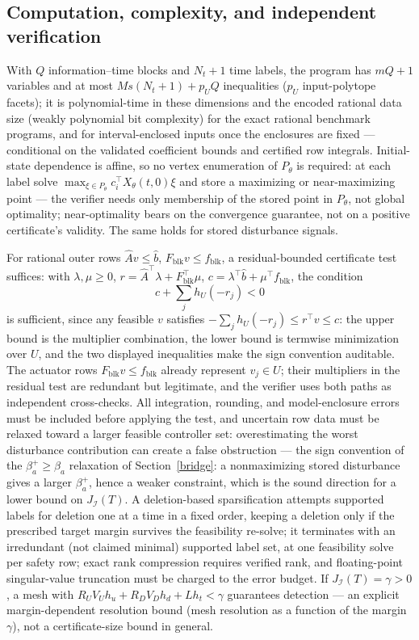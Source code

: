 \documentclass[10pt,twocolumn]{article}
\theoremstyle{plain}
\theoremstyle{definition}
\theoremstyle{remark}
\begin{document}
\subsection{Computation, complexity, and independent verification}\label{computation}

With \(Q\) information--time blocks and \(N_t + 1\) time labels, the program
has \(mQ + 1\) variables and at most \(Ms(N_t{+}1) + p_U Q\) inequalities
(\(p_U\) input-polytope facets); it is polynomial-time in these dimensions and the encoded rational data
size (weakly polynomial bit complexity) for the exact rational benchmark
programs, and for interval-enclosed inputs once the enclosures are fixed ---
conditional on the validated coefficient bounds and certified row
integrals.
Initial-state dependence is affine, so no vertex enumeration of \(P_\theta\)
is required: at each label solve
\(\max_{\xi \in P_\theta} c_i^\top X_\theta(t,0)\xi\) and store a maximizing
or near-maximizing point --- the verifier needs only membership of the stored
point in \(P_\theta\), not global optimality; near-optimality bears on the
convergence guarantee, not on a positive certificate's validity. The same
holds for stored disturbance signals.

For rational outer rows \(\widehat A v \le \widehat b\),
\(F_{\mathrm{blk}} v \le f_{\mathrm{blk}}\), a residual-bounded certificate
test suffices: with \(\lambda, \mu \ge 0\),
\(r = \widehat A^\top \lambda + F_{\mathrm{blk}}^\top \mu\),
\(c = \lambda^\top \widehat b + \mu^\top f_{\mathrm{blk}}\), the condition
\[
c + \sum_j h_U(-r_j) < 0
\tag{11}
\]
is sufficient, since any feasible \(v\) satisfies
\(-\sum_j h_U(-r_j) \le r^\top v \le c\): the upper bound is the
multiplier combination, the lower bound is termwise minimization over
\(U\), and the two displayed inequalities make the sign convention
auditable. The actuator rows \(F_{\mathrm{blk}} v \le f_{\mathrm{blk}}\)
already represent \(v_j \in U\); their multipliers in the residual test
are redundant but legitimate, and the verifier uses both paths as
independent cross-checks. All integration, rounding, and
model-enclosure errors must be included before applying the test, and
uncertain row data must be relaxed toward a larger feasible controller set:
overestimating the worst disturbance contribution can create a false
obstruction --- the sign convention of the \(\beta_a^{+} \ge \beta_a\)
relaxation of Section~\ref{bridge}: a nonmaximizing stored disturbance
gives a larger \(\beta_a^{+}\), hence a weaker constraint, which is the
sound direction for a lower bound on \(J_{\mathcal{I}}(T)\). A deletion-based sparsification attempts supported labels for deletion
one at a time in a fixed order, keeping a deletion only if the prescribed
target margin survives the feasibility re-solve; it terminates with an
irredundant (not claimed minimal) supported label set, at one feasibility
solve per safety row; exact rank compression requires verified rank, and
floating-point singular-value truncation must be charged to the error budget.
If \(J_{\mathcal{I}}(T) = \gamma > 0\), a mesh with
\(R_U V_U h_u + R_D V_D h_d + L h_t < \gamma\) guarantees detection --- an explicit margin-dependent resolution bound
(mesh resolution as a function of the margin \(\gamma\)), not a
certificate-size bound in general.
\end{document}
